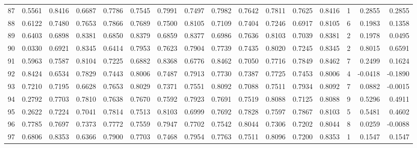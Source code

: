 \begin{tabular}{lrrrrrrrrrrrrrrr}
87  &      0.5561 &  0.8416 &  0.6687 &  0.7786 &  0.7545 &  0.7991 &  0.7497 &  0.7982 &  0.7642 &  0.7811 &   0.7625 &     0.8416 &      1 &                    0.2855 &                     0.2855 \\
88  &      0.6122 &  0.7480 &  0.7653 &  0.7866 &  0.7689 &  0.7500 &  0.8105 &  0.7109 &  0.7404 &  0.7246 &   0.6917 &     0.8105 &      6 &                    0.1983 &                     0.1358 \\
89  &      0.6403 &  0.6898 &  0.8381 &  0.6850 &  0.8379 &  0.6859 &  0.8377 &  0.6986 &  0.7636 &  0.8103 &   0.7039 &     0.8381 &      2 &                    0.1978 &                     0.0495 \\
90  &      0.0330 &  0.6921 &  0.8345 &  0.6414 &  0.7953 &  0.7623 &  0.7904 &  0.7739 &  0.7435 &  0.8020 &   0.7245 &     0.8345 &      2 &                    0.8015 &                     0.6591 \\
91  &      0.5963 &  0.7587 &  0.8104 &  0.7225 &  0.6882 &  0.8368 &  0.6776 &  0.8462 &  0.7050 &  0.7716 &   0.7849 &     0.8462 &      7 &                    0.2499 &                     0.1624 \\
92  &      0.8424 &  0.6534 &  0.7829 &  0.7443 &  0.8006 &  0.7487 &  0.7913 &  0.7730 &  0.7387 &  0.7725 &   0.7453 &     0.8006 &      4 &                   -0.0418 &                    -0.1890 \\
93  &      0.7210 &  0.7195 &  0.6628 &  0.7653 &  0.8029 &  0.7371 &  0.7551 &  0.8092 &  0.7088 &  0.7511 &   0.7934 &     0.8092 &      7 &                    0.0882 &                    -0.0015 \\
94  &      0.2792 &  0.7703 &  0.7810 &  0.7638 &  0.7670 &  0.7592 &  0.7923 &  0.7691 &  0.7519 &  0.8088 &   0.7125 &     0.8088 &      9 &                    0.5296 &                     0.4911 \\
95  &      0.2622 &  0.7224 &  0.7041 &  0.7814 &  0.7513 &  0.8103 &  0.6999 &  0.7692 &  0.7828 &  0.7597 &   0.7867 &     0.8103 &      5 &                    0.5481 &                     0.4602 \\
96  &      0.7785 &  0.7697 &  0.7373 &  0.7772 &  0.7559 &  0.7947 &  0.7702 &  0.7542 &  0.8044 &  0.7306 &   0.7202 &     0.8044 &      8 &                    0.0259 &                    -0.0088 \\
97  &      0.6806 &  0.8353 &  0.6366 &  0.7900 &  0.7703 &  0.7468 &  0.7954 &  0.7763 &  0.7511 &  0.8096 &   0.7200 &     0.8353 &      1 &                    0.1547 &                     0.1547 \\

\end{tabular}
